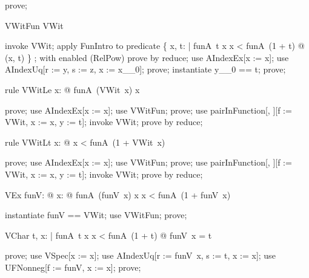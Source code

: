 \documentclass{article}
\begin{document}
\begin{zproof}
prove;
\end{zproof}

\begin{theorem}{VWitFun}
  VWit \in \nat \fun \nat
\end{theorem}

\begin{zproof}
invoke VWit;
apply FunIntro to predicate \{ x, t: \nat | funA~t \leq x \land x < funA~(1 + t) @ (x, t) \}
  \in \nat \fun \nat;
with enabled (RelPow) prove by reduce;
use AIndexEx[x := x];
use AIndexUq[r := y, s := z, x := x\_\_0];
prove;
instantiate y\_\_0 == t;
prove;
\end{zproof}

\begin{theorem}{rule VWitLe}
  \forall x: \nat @ funA~(VWit~x) \leq x
\end{theorem}

\begin{zproof}
prove;
use AIndexEx[x := x];
use VWitFun;
prove;
use pairInFunction[\nat, \nat][f := VWit, x := x, y := t];
invoke VWit;
prove by reduce;
\end{zproof}

\begin{theorem}{rule VWitLt}
  \forall x: \nat @ x < funA~(1 + VWit~x)
\end{theorem}

\begin{zproof}
prove;
use AIndexEx[x := x];
use VWitFun;
prove;
use pairInFunction[\nat, \nat][f := VWit, x := x, y := t];
invoke VWit;
prove by reduce;
\end{zproof}

\begin{theorem}{VEx}
  \exists funV: \nat \fun \nat @ \forall x: \nat @ funA~(funV~x) \leq x \land x < funA~(1 + funV~x)
\end{theorem}

\begin{zproof}
instantiate funV == VWit;
use VWitFun;
prove;
\end{zproof}

\begin{theorem}{VChar}
  \forall t, x: \nat | funA~t \leq x \land x < funA~(1 + t) @ funV~x = t
\end{theorem}

\begin{zproof}
prove;
use VSpec[x := x];
use AIndexUq[r := funV~x, s := t, x := x];
use UFNonneg[f := funV, x := x];
prove;
\end{zproof}
\end{document}
